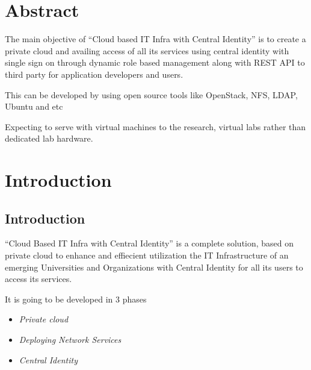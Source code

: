 \documentclass[12pt]{report}
\begin{document}
 
\chapter*{Abstract}
\setcounter{page}{1}
\normalsize
\hspace{0.5cm} The main objective of ``Cloud based IT Infra with Central Identity'' is to create a  private cloud and availing access of all its services using central identity with single sign on through dynamic role based management along with REST API to third party for application developers and users. \newline

This can be developed by using open source tools like OpenStack, NFS, LDAP, Ubuntu and etc \newline

Expecting to serve with virtual machines to the research, virtual labs rather than dedicated lab hardware.


\setcounter{page}{2}
\tableofcontents
\listoffigures
\listoftables
\pagebreak \thispagestyle{empty} \pagebreak

 
\setcounter{page}{1}


\chapter{Introduction}

\section{Introduction}
	``Cloud Based IT Infra with Central Identity'' is a complete solution, based on private cloud to enhance and effiecient utilization the IT Infrastructure of an emerging Universities and Organizations with Central Identity for all its users to access its services.\newline

	It is going to be developed in 3 phases 
	\begin{itemize}
		\item \textit{Private cloud} 
		\item \textit{Deploying Network Services} 
		\item \textit{Central Identity}
	\end{itemize}
	
\end{document}
